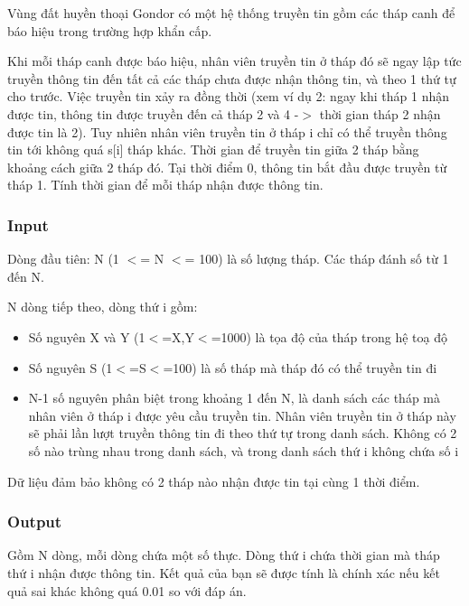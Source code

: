 

Vùng đất huyền thoại Gondor có một hệ thống truyền tin gồm các tháp canh để báo hiệu trong trường hợp khẩn cấp.

Khi mỗi tháp canh được báo hiệu, nhân viên truyền tin ở tháp đó sẽ ngay lập tức truyền thông tin đến tất cả các tháp chưa được nhận thông tin, và theo 1 thứ tự cho trước. Việc truyền tin xảy ra đồng thời (xem ví dụ 2: ngay khi tháp 1 nhận được tin, thông tin được truyền đến cả tháp 2 và 4 -$>$ thời gian tháp 2 nhận được tin là 2). Tuy nhiên nhân viên truyền tin ở tháp i chỉ có thể truyền thông tin tới không quá s[i] tháp khác. Thời gian để truyền tin giữa 2 tháp bằng khoảng cách giữa 2 tháp đó. Tại thời điểm 0, thông tin bắt đầu được truyền từ tháp 1. Tính thời gian để mỗi tháp nhận được thông tin.

\subsubsection{Input}

Dòng đầu tiên: N (1 $<$= N $<$= 100) là số lượng tháp. Các tháp đánh số từ 1 đến N.

N dòng tiếp theo, dòng thứ i gồm:
\begin{itemize}
	\item Số nguyên X và Y (1$<$=X,Y$<$=1000) là tọa độ của tháp trong hệ toạ độ
	\item Số nguyên S (1$<$=S$<$=100) là số tháp mà tháp đó có thể truyền tin đi
	\item N-1 số nguyên phân biệt trong khoảng 1 đến N, là danh sách các tháp mà nhân viên ở tháp i được yêu cầu truyền tin. Nhân viên truyền tin ở tháp này sẽ phải lần lượt truyền thông tin đi theo thứ tự trong danh sách. Không có 2 số nào trùng nhau trong danh sách, và trong danh sách thứ i không chứa số i
\end{itemize}

Dữ liệu đảm bảo không có 2 tháp nào nhận được tin tại cùng 1 thời điểm.

\subsubsection{Output}

Gồm N dòng, mỗi dòng chứa một số thực. Dòng thứ i chứa thời gian mà tháp thứ i nhận được thông tin. Kết quả của bạn sẽ được tính là chính xác nếu kết quả sai khác không quá 0.01 so với đáp án.

